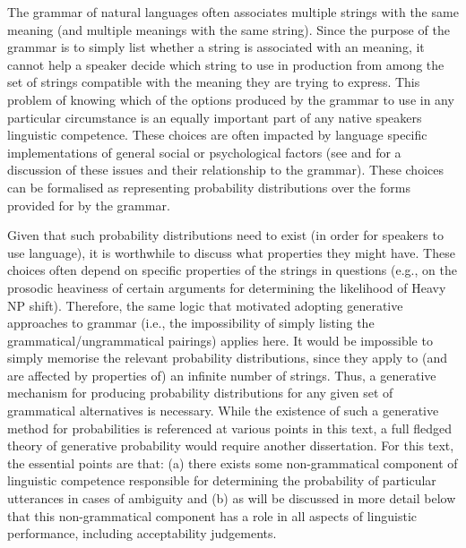 The grammar of natural languages often associates multiple strings with the same meaning (and multiple meanings with the same string). Since the purpose of the grammar is to simply list whether a string is associated with an meaning, it cannot help a speaker decide which string to use in production from among the set of strings compatible with the meaning they are trying to express. This problem of knowing which of the options produced by the grammar to use in any particular circumstance is an equally important part of any native speakers linguistic competence. These choices are often impacted by language specific implementations of general social or psychological factors (see \cite{Bresnan.2007,Bresnan.2010,Zeevat.2014} and \cite{Tamminga.2016} for a discussion of these issues and their relationship to the grammar). These choices can be formalised as representing probability distributions over the forms provided for by the grammar.

Given that such probability distributions need to exist (in order for speakers to use language), it is worthwhile to discuss what properties they might have. These choices often depend on specific properties of the strings in questions (e.g., on the prosodic heaviness of certain arguments for determining the likelihood of Heavy NP shift). Therefore, the same logic that motivated adopting generative approaches to grammar (i.e., the impossibility of simply listing the grammatical/ungrammatical pairings) applies here. It would be impossible to simply memorise the relevant probability distributions, since they apply to (and are affected by properties of) an infinite number of strings. Thus, a generative mechanism for producing probability distributions for any given set of grammatical alternatives is necessary. While the existence of such a generative method for probabilities is referenced at various points in this text, a full fledged theory of generative probability would require another dissertation. For this text, the essential points are that: (a) there exists some non-grammatical component of linguistic competence responsible for determining the probability of particular utterances in cases of ambiguity and (b) as will be discussed in more detail below that this non-grammatical component has a role in all aspects of linguistic performance, including acceptability judgements.

